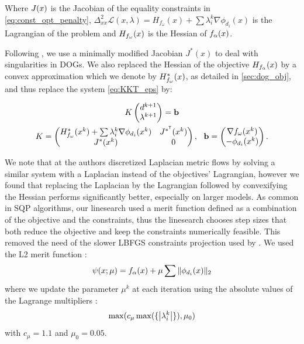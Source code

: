 Where $J(x)$ is the Jacobian of the equality constraints in \eqref{eq:const_opt_penalty}, $\Delta^2_{xx}\mathcal{L}(x,\lambda) = H_{f_\omega}(x)+\sum\lambda_i^{k} \nabla \phi_{d_i}(x)$ is the Lagrangian of the problem and $H_{f_\omega}(x)$ is the Hessian of $f_\alpha(x)$.

Following \cite{rabi2018shape}, we use a minimally modified Jacobian $J^*(x)$ to deal with singularities in DOGs. We also replaced the Hessian of the objective $H_{f_\alpha}(x)$ by a convex approximation which we denote by $H^*_{f_\omega}(x)$, as detailed in \ref{sec:dog_obj}, and thus replace the system \eqref{eq:KKT_eps} by:

\begin{equation} \label{eq:KKT_us}
\begin{gathered}
{K} \begin{pmatrix} d^{k+1} \\ \lambda^{k+1} \end{pmatrix}=\mathbf{b} \\
{K}=\begin{pmatrix}
{ H^*_{f_\omega}(\x^k)+\sum\lambda_i^{k} \nabla \phi_{d_i}(\x^k)} & {J^{*^\tr}(\x^k)}\\
{J^*(\x^k)} &  0 \\
\end{pmatrix}, \ \ 
\mathbf{b}=\begin{pmatrix}
{\nabla f_\omega(x^k)} \\ 
-\phi_{d_i}(x^k)\\
\end{pmatrix}.
\end{gathered}
\end{equation}

We note that at \cite{rabi2018shape} the authors discretized Laplacian metric flows by solving a similar system with a Laplacian instead of the objectives' Lagrangian, however we found that replacing the Laplacian by the Lagrangian followed by convexifying the Hessian performs significantly better, especially on larger models. As common in SQP algorithms, our linesearch used a merit function defined as a combination of the objective and the constraints, thus the linesearch chooses step sizes that both reduce the objective and keep the constraints numerically feasible. This removed the need of the slower LBFGS constraints projection used by \cite{rabi18,rabi2018shape}. We used the L2 merit function \cite{nocedal}:
\begin{equation}
\psi(x;\mu) = f_\alpha(x)+\mu\sum\|\phi_{d_i}(x)\|_2
\end{equation}
where we update the parameter $\mu^k$ at each iteration using the absolute values of the Lagrange multipliers \cite{nocedal}:
\begin{equation}
\max(c_\mu \max(\{\left\vert\lambda_i^k\right\vert\}), \mu_0)	
\end{equation}
with $c_\mu = 1.1$ and $\mu_0 = 0.05$.

